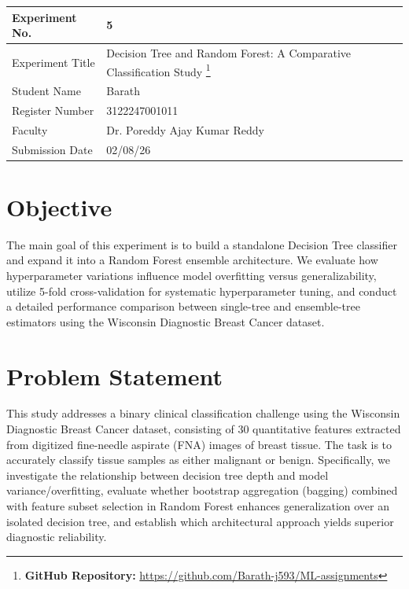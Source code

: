 \documentclass[12pt,a4paper]{article}
\begin{document}
\begin{tabular}{|p{4cm}|p{11cm}|}
\hline
Experiment No. & 5 \\ \hline
Experiment Title & Decision Tree and Random Forest: A Comparative Classification Study
\footnote{\textbf{GitHub Repository: }\url{https://github.com/Barath-j593/ML-assignments}}\\ \hline
Student Name & Barath \\ \hline
Register Number & 3122247001011 \\ \hline
Faculty & Dr. Poreddy Ajay Kumar Reddy \\ \hline
Submission Date & 02/08/26 \\ \hline
\end{tabular}

\section{Objective}
The main goal of this experiment is to build a standalone Decision Tree classifier and expand it into a Random Forest ensemble architecture. We evaluate how hyperparameter variations influence model overfitting versus generalizability, utilize 5-fold cross-validation for systematic hyperparameter tuning, and conduct a detailed performance comparison between single-tree and ensemble-tree estimators using the Wisconsin Diagnostic Breast Cancer dataset.

\section{Problem Statement}
This study addresses a binary clinical classification challenge using the Wisconsin Diagnostic Breast Cancer dataset, consisting of 30 quantitative features extracted from digitized fine-needle aspirate (FNA) images of breast tissue. The task is to accurately classify tissue samples as either malignant or benign. Specifically, we investigate the relationship between decision tree depth and model variance/overfitting, evaluate whether bootstrap aggregation (bagging) combined with feature subset selection in Random Forest enhances generalization over an isolated decision tree, and establish which architectural approach yields superior diagnostic reliability.
\end{document}
